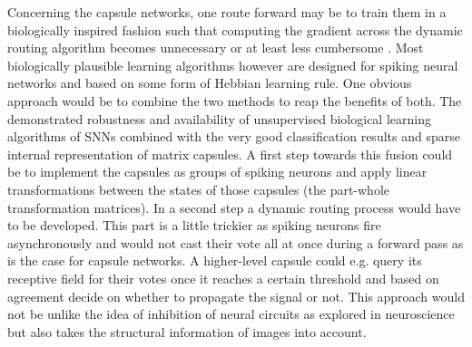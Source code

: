 Concerning the capsule networks, one route forward may be to train them in a biologically inspired fashion such that computing the gradient across the dynamic routing algorithm becomes unnecessary or at least less cumbersome \cite{bartunov2018assessing}. Most biologically plausible learning algorithms however are designed for spiking neural networks and based on some form of Hebbian learning rule. One obvious approach would be to combine the two methods to reap the benefits of both. The demonstrated robustness and availability of unsupervised biological learning algorithms of SNNs combined with the very good classification results and sparse internal representation of matrix capsules. A first step towards this fusion could be to implement the capsules as groups of spiking neurons and apply linear transformations between the states of those capsules (the part-whole transformation matrices). In a second step a dynamic routing process would have to be developed. This part is a little trickier as spiking neurons fire asynchronously and would not cast their vote all at once during a forward pass as is the case for capsule networks. A higher-level capsule could e.g. query its receptive field for their votes once it reaches a certain threshold and based on agreement decide on whether to propagate the signal or not. This approach would not be unlike the idea of inhibition of neural circuits as explored in neuroscience but also takes the structural information of images into account.